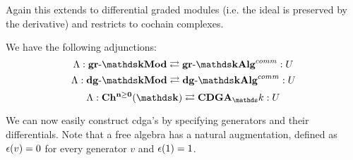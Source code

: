 Again this extends to differential graded modules (i.e. the ideal is preserved by the derivative) and restricts to cochain complexes.

\begin{lemma}
	We have the following adjunctions:
	$$ \Lambda: \grMod{\k} \leftadj \grAlg{\k}^{comm} :U $$
	$$ \Lambda: \dgMod{\k} \leftadj \dgAlg{\k}^{comm} :U $$
	$$ \Lambda: \CoCh{\k} \leftadj \CDGA_\k :U $$
\end{lemma}

We can now easily construct cdga's by specifying generators and their differentials. Note that a free algebra has a natural augmentation, defined as $\epsilon(v) = 0$ for every generator $v$ and $\epsilon(1) = 1$.
